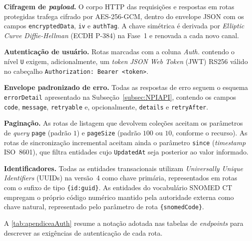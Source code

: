 \textbf{Cifragem de \textit{payload}.} O corpo HTTP das requisições e respostas em rotas protegidas trafega cifrado por AES-256-GCM, dentro do envelope JSON com os campos \texttt{encryptedData}, \texttt{iv} e \texttt{authTag}. A chave simétrica é derivada por \textit{Elliptic Curve Diffie-Hellman} (ECDH P-384) na Fase~1 e renovada a cada novo canal.

\textbf{Autenticação de usuário.} Rotas marcadas com a coluna \textit{Auth.} contendo o nível \texttt{U} exigem, adicionalmente, um \textit{token} \textit{JSON Web Token} (JWT) RS256 válido no cabeçalho \texttt{Authorization: Bearer <token>}.

\textbf{Envelope padronizado de erro.} Todas as respostas de erro seguem o esquema \texttt{errorDetail} apresentado na Subseção~\ref{subsec:NPIAPI}, contendo os campos \texttt{code}, \texttt{message}, \texttt{retryable} e, opcionalmente, \texttt{details} e \texttt{retryAfter}.

\textbf{Paginação.} As rotas de listagem que devolvem coleções aceitam os parâmetros de \textit{query} \texttt{page} (padrão $1$) e \texttt{pageSize} (padrão $100$ ou $10$, conforme o recurso). As rotas de sincronização incremental aceitam ainda o parâmetro \texttt{since} (\textit{timestamp} ISO~8601), que filtra entidades cujo \texttt{UpdatedAt} seja posterior ao valor informado.

\textbf{Identificadores.} Todas as entidades transacionais utilizam \textit{Universally Unique Identifiers} (UUIDs) na versão~4 como chave primária, representados em rotas com o sufixo de tipo \texttt{\{id:guid\}}. As entidades do vocabulário SNOMED CT empregam o próprio código numérico mantido pela autoridade externa como chave natural, representado pelo parâmetro de rota \texttt{\{snomedCode\}}.

A \autoref{tab:apendiceaAuth} resume a notação adotada nas tabelas de \textit{endpoints} para descrever as exigências de autenticação de cada rota.

